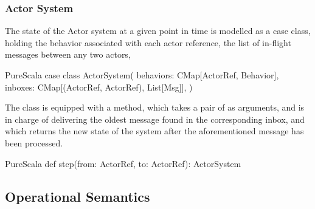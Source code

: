 %
%

\subsubsection*{Actor System}

The state of the Actor system at a given point in time is modelled as a case class, 
holding the behavior associated with each actor reference, the list of in-flight messages between any two actors,

\begin{ShortCode}{PureScala}
case class ActorSystem(
  behaviors: CMap[ActorRef, Behavior],
  inboxes: CMap[(ActorRef, ActorRef), List[Msg]],
)
\end{ShortCode}

The  class is equipped with a  method, which takes 
a pair of \ActorRef as arguments, and is in charge of delivering the oldest message 
found in the corresponding inbox, and which returns the new state of the system after 
the aforementioned message has been processed.

\begin{ShortCode}{PureScala}
def step(from: ActorRef, to: ActorRef): ActorSystem
\end{ShortCode}

\subsection{Operational Semantics}
\label{semantics}

